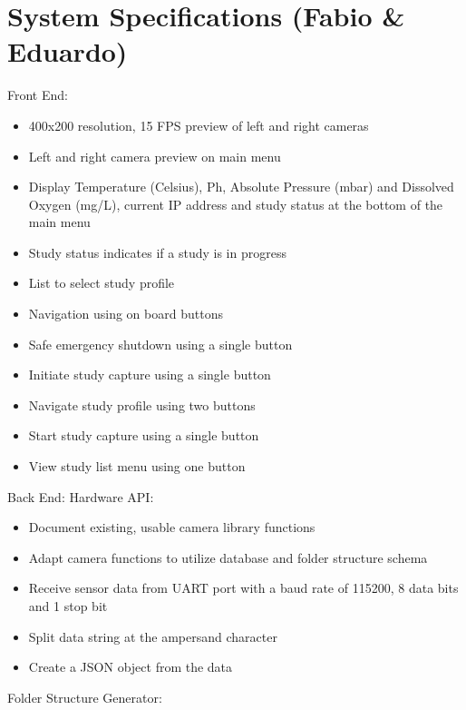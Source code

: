 \section{System Specifications (Fabio \& Eduardo)}
Front End:
\begin{itemize}
	\item 400x200 resolution, 15 FPS preview of left and right cameras
	\item Left and right camera preview on main menu
	\item Display Temperature (Celsius), Ph, Absolute Pressure (mbar) and Dissolved Oxygen (mg/L), current IP address and study status at the bottom of the main menu
	\item Study status indicates if a study is in progress
	\item List to select study profile
	\item Navigation using on board buttons
	\item Safe emergency shutdown using a single button
	\item Initiate study capture using a single button
	\item Navigate study profile using two buttons
	\item Start study capture using a single button
	\item View study list menu using one button
\end{itemize}
Back End:
Hardware API:
\begin{itemize}
	\item Document existing, usable camera library functions
	\item Adapt camera functions to utilize database and folder structure schema
	\item Receive sensor data from UART port with a baud rate of 115200, 8 data bits and 1 stop bit
	\item Split data string at the ampersand character
	\item Create a JSON object from the data
\end{itemize}
Folder Structure Generator: